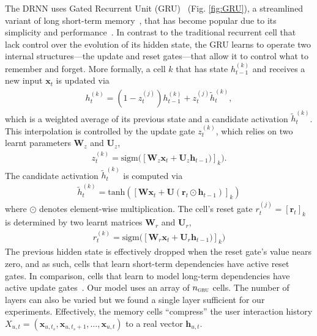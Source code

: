 \documentclass{sig-alternate-05-2015}
\newcommand{\mat}[1]{\mathbf{#1}}
\begin{document}
The DRNN uses Gated Recurrent Unit (GRU)~\cite{Cho2014} (Fig. \ref{fig:GRU}), a streamlined variant of long short-term memory~\cite{Hochreiter1997}, that has become popular due to its simplicity and performance~\cite{jozefowicz2015empirical}. In contrast to the traditional recurrent cell that lack control over the evolution of  its hidden state, the GRU learns to operate two internal structures---the update and reset gates---that allow it to control what to remember and forget. More formally, a cell $k$ that has state $h_{t-1}^{(k)}$ and receives a new input $\mathbf{x}_t$ is updated via
\begin{align}
	h_t^{(k)} = (1-z_t^{(j)})h^{(k)}_{t-1} + z_t^{(j)}\tilde{h}_{t}^{(k)},
\end{align}
which is a weighted average of its previous state and a  candidate activation $\tilde{h}_{t}^{(k)}$. This interpolation is controlled by the update gate $z_t^{(k)}$, which relies on two learnt parameters $\mat{W}_z$ and $\mat{U}_z$,
\begin{align}
	z_t^{(k)} = \textrm{sigm}\big([\mat{W}_z\mat{x}_{t} + \mat{U}_z\mat{h}_{t-1})]_k\big).
\end{align}
The candidate activation $\tilde{h}_{t}^{(k)}$ is computed via
\begin{align}
	\tilde{h}_{t}^{(k)} = \mathrm{tanh}([\mat{W}\mat{x}_t + \mat{U}(\mat{r}_t \odot \mat{h}_{t-1})]_k )
\end{align}
where $\odot$ denotes element-wise multiplication. The cell's reset gate $r^{(j)}_t = [\mat{r}_t]_k$ is determined by two learnt matrices $\mat{W}_r$ and $\mat{U}_r$,
\begin{align}
	r^{(k)}_t = \textrm{sigm}\big([\mat{W}_r\mat{x}_{t} + \mat{U}_r\mat{h}_{t-1})]_k\big)
\end{align}
The previous hidden state is effectively dropped when the reset gate's value nears zero, and as such, cells that learn short-term dependencies  have active reset gates. In comparison, cells that learn to model long-term dependencies have active update gates~\cite{Cho2014}. Our model uses an array of $n_\textsc{gru}$ cells. The number of layers can also be varied but we found a single layer sufficient for our experiments. Effectively, the memory cells ``compress'' the user interaction history $X_{u,t} = (\mat{x}_{u,t_s}, \mat{x}_{u,t_s + 1}, \dots, \mat{x}_{u,t})$ to a real vector $\mat{h}_{u,t}$.
\end{document}
